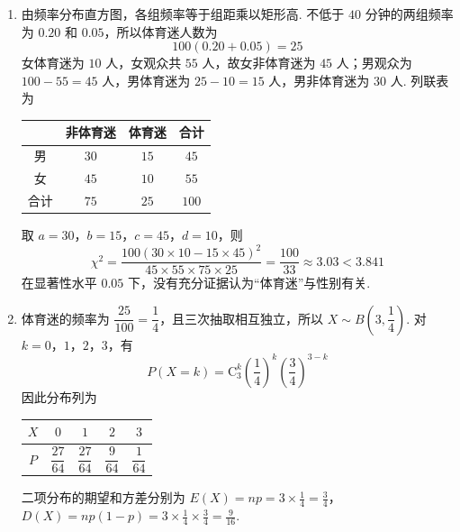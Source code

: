 \begin{solution}
\begin{enumerate}
\item 由频率分布直方图，各组频率等于组距乘以矩形高. 不低于 \(40\) 分钟的两组频率为 \(0.20\) 和 \(0.05\)，所以体育迷人数为
\[
100(0.20+0.05)=25
\]
女体育迷为 \(10\) 人，女观众共 \(55\) 人，故女非体育迷为 \(45\) 人；男观众为 \(100-55=45\) 人，男体育迷为 \(25-10=15\) 人，男非体育迷为 \(30\) 人. 列联表为

\begin{center}
\begin{tabular}{|c|c|c|c|}
\hline
 & 非体育迷 & 体育迷 & 合计 \\
\hline
男 & \(30\) & \(15\) & \(45\) \\
\hline
女 & \(45\) & \(10\) & \(55\) \\
\hline
合计 & \(75\) & \(25\) & \(100\) \\
\hline
\end{tabular}
\end{center}

取 \(a=30\)，\(b=15\)，\(c=45\)，\(d=10\)，则
\[
\chi^2=\frac{100(30\times10-15\times45)^2}{45\times55\times75\times25}=\frac{100}{33}\approx3.03<3.841
\]
在显著性水平 \(0.05\) 下，没有充分证据认为“体育迷”与性别有关.
\item 体育迷的频率为 \(\dfrac{25}{100}=\dfrac14\)，且三次抽取相互独立，所以 \(X\sim B\left(3,\dfrac{1}{4}\right)\). 对 \(k=0\)，\(1\)，\(2\)，\(3\)，有
\[
P(X=k)=\mathrm C_3^k\left(\frac14\right)^k\left(\frac34\right)^{3-k}
\]
因此分布列为
\begin{center}
\begin{tabular}{|c|c|c|c|c|}
\hline
\(X\) & \(0\) & \(1\) & \(2\) & \(3\) \\
\hline
\(P\) & \(\dfrac{27}{64}\) & \(\dfrac{27}{64}\) & \(\dfrac{9}{64}\) & \(\dfrac{1}{64}\) \\
\hline
\end{tabular}
\end{center}
二项分布的期望和方差分别为
\(E(X)=np=3\times\frac14=\frac34\)，\(D(X)=np(1-p)=3\times\frac14\times\frac34=\frac9{16}\).
\end{enumerate}
\end{solution}

